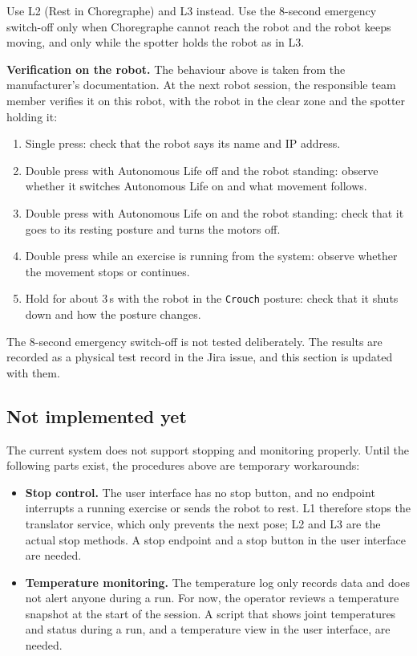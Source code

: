 \documentclass[12pt,a4paper]{article}
\begin{document}
Use L2 (Rest in Choregraphe) and L3 instead. Use the 8-second emergency switch-off only when Choregraphe cannot reach the robot and the robot keeps moving, and only while the spotter holds the robot as in L3.

\textbf{Verification on the robot.} The behaviour above is taken from the manufacturer's documentation. At the next robot session, the responsible team member verifies it on this robot, with the robot in the clear zone and the spotter holding it:

\begin{enumerate}
\item Single press: check that the robot says its name and IP address.
\item Double press with Autonomous Life off and the robot standing: observe whether it switches Autonomous Life on and what movement follows.
\item Double press with Autonomous Life on and the robot standing: check that it goes to its resting posture and turns the motors off.
\item Double press while an exercise is running from the system: observe whether the movement stops or continues.
\item Hold for about 3\,s with the robot in the \texttt{Crouch} posture: check that it shuts down and how the posture changes.
\end{enumerate}

The 8-second emergency switch-off is not tested deliberately. The results are recorded as a physical test record in the Jira issue, and this section is updated with them.

\subsection{Not implemented yet}
\label{sec:missing}

The current system does not support stopping and monitoring properly. Until the following parts exist, the procedures above are temporary workarounds:

\begin{itemize}
\item \textbf{Stop control.} The user interface has no stop button, and no endpoint interrupts a running exercise or sends the robot to rest. L1 therefore stops the translator service, which only prevents the next pose; L2 and L3 are the actual stop methods. A stop endpoint and a stop button in the user interface are needed.
\item \textbf{Temperature monitoring.} The temperature log only records data and does not alert anyone during a run. For now, the operator reviews a temperature snapshot at the start of the session. A script that shows joint temperatures and status during a run, and a temperature view in the user interface, are needed.
\end{itemize}
\end{document}
